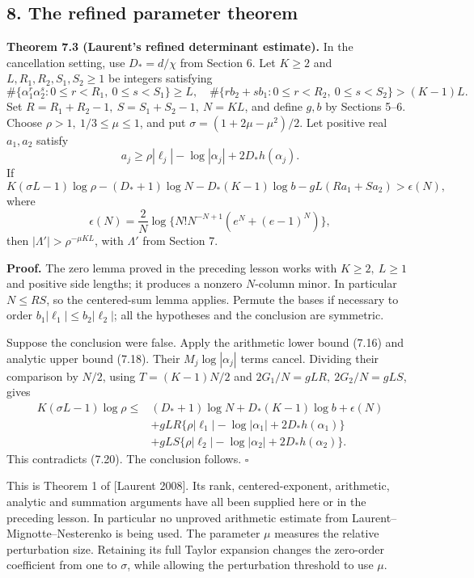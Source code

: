 \documentclass[
  11pt,
  a4paper,
]{article}
\begin{document}
\subsection{8. The refined parameter
theorem}\label{the-refined-parameter-theorem}

\textbf{Theorem 7.3 (Laurent's refined determinant estimate).} In the
cancellation setting, use \(D_*=d/\chi\) from Section 6. Let \(K\ge2\)
and \(L,R_1,R_2,S_1,S_2\ge1\) be integers satisfying \[
\#\{\alpha_1^r\alpha_2^s:0\le r<R_1,\ 0\le s<S_1\}\ge L,
\quad
\#\{rb_2+sb_1:0\le r<R_2,\ 0\le s<S_2\}>(K-1)L.
\] Set \(R=R_1+R_2-1,\ S=S_1+S_2-1,\ N=KL\), and define \(g,b\) by
Sections 5--6. Choose \(\rho>1,\ 1/3\le\mu\le1\), and put
\(\sigma=(1+2\mu-\mu^2)/2\). Let positive real \(a_1,a_2\) satisfy \[
a_j\ge\rho|\ell_j|-\log|\alpha_j|+2D_*h(\alpha_j).
\] If \[
K(\sigma L-1)\log\rho
-(D_*+1)\log N-D_*(K-1)\log b
-gL(Ra_1+Sa_2)>\epsilon(N), \tag{7.20}
\] where \[
\epsilon(N)=\frac2N
\log\{N!N^{-N+1}(e^N+(e-1)^N)\},
\] then \(|\Lambda'|>\rho^{-\mu KL}\), with \(\Lambda'\) from Section 7.

\textbf{Proof.} The zero lemma proved in the preceding lesson works with
\(K\ge2,\ L\ge1\) and positive side lengths; it produces a nonzero
\(N\)-column minor. In particular \(N\le RS\), so the centered-sum lemma
applies. Permute the bases if necessary to order
\(b_1|\ell_1|\le b_2|\ell_2|\); all the hypotheses and the conclusion
are symmetric.

Suppose the conclusion were false. Apply the arithmetic lower bound
(7.16) and analytic upper bound (7.18). Their \(M_j\log|\alpha_j|\)
terms cancel. Dividing their comparison by \(N/2\), using \(T=(K-1)N/2\)
and \(2G_1/N=gLR,\ 2G_2/N=gLS\), gives \[
\begin{aligned}
K(\sigma L-1)\log\rho\le{}&
(D_*+1)\log N+D_*(K-1)\log b+\epsilon(N)\\
&+gLR\{\rho|\ell_1|-\log|\alpha_1|+2D_*h(\alpha_1)\}\\
&+gLS\{\rho|\ell_2|-\log|\alpha_2|+2D_*h(\alpha_2)\}.
\end{aligned}
\] This contradicts (7.20). The conclusion follows. \(\square\)

This is Theorem 1 of {[}Laurent 2008{]}. Its rank, centered-exponent,
arithmetic, analytic and summation arguments have all been supplied here
or in the preceding lesson. In particular no unproved arithmetic
estimate from Laurent--Mignotte--Nesterenko is being used. The parameter
\(\mu\) measures the relative perturbation size. Retaining its full
Taylor expansion changes the zero-order coefficient from one to
\(\sigma\), while allowing the perturbation threshold to use \(\mu\).
\end{document}
